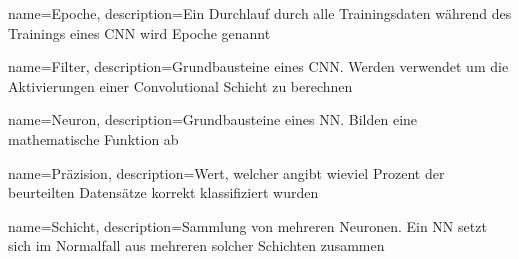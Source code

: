

{
  name={Epoche},
  description={Ein Durchlauf durch alle Trainingsdaten während des Trainings eines CNN wird Epoche genannt}
}

{
  name={Filter},
  description={Grundbausteine eines CNN. Werden verwendet um die Aktivierungen einer Convolutional Schicht zu berechnen}
}

{
  name={Neuron},
  description={Grundbausteine eines NN. Bilden eine mathematische Funktion ab}
}

{
  name={Präzision},
  description={Wert, welcher angibt wieviel Prozent der beurteilten Datensätze korrekt klassifiziert wurden}
}

{
  name={Schicht},
  description={Sammlung von mehreren Neuronen. Ein NN setzt sich im Normalfall aus mehreren solcher Schichten zusammen}
}


